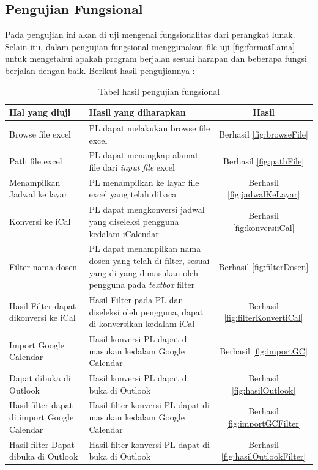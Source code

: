 \subsection{Pengujian Fungsional}
Pada pengujian ini akan di uji mengenai fungsionalitas dari perangkat lunak. Selain itu, dalam pengujian fungsional menggunakan file uji \ref{fig:formatLama} untuk mengetahui apakah program berjalan sesuai harapan dan beberapa fungsi berjalan dengan baik. Berikut hasil pengujiannya : 
\begin{table}[H]
	\centering
		\caption{Tabel hasil pengujian fungsional}
		\label{tab:fungsional}
		\begin{tabular}{ | p{4cm} | p{4cm} | c | }
			\hline
				Hal yang diuji & Hasil yang diharapkan & Hasil \\ \hline
				Browse file excel & PL dapat melakukan browse file excel & Berhasil \ref{fig:browseFile}\\ \hline
				Path file excel & PL dapat menangkap alamat file dari \textit{input file} excel & Berhasil \ref{fig:pathFile} \\ \hline
				Menampilkan Jadwal ke layar & PL menampilkan ke layar file excel yang telah dibaca & Berhasil \ref{fig:jadwalKeLayar} \\ \hline
				Konversi ke iCal & PL dapat mengkonversi jadwal yang diseleksi pengguna kedalam iCalendar & Berhasil \ref{fig:konversiiCal} \\ \hline
				Filter nama dosen & PL dapat menampilkan nama dosen yang telah di filter, sesuai yang di yang dimasukan oleh pengguna pada \textit{textbox} filter & Berhasil \ref{fig:filterDosen} \\ \hline
				Hasil Filter dapat dikonversi ke iCal & Hasil Filter pada PL dan diseleksi oleh pengguna, dapat di konversikan kedalam iCal & Berhasil \ref{fig:filterKonvertiCal} \\ \hline
				Import Google Calendar & Hasil konversi PL dapat di masukan kedalam Google Calendar & Berhasil \ref{fig:importGC} \\ \hline
				Dapat dibuka di Outlook & Hasil konversi PL dapat di buka di Outlook & Berhasil  \ref{fig:hasilOutlook}\\ \hline
				Hasil filter dapat di import Google Calendar & Hasil filter konversi PL dapat di masukan kedalam Google Calendar & Berhasil \ref{fig:importGCFilter} \\ \hline
				Hasil filter Dapat dibuka di Outlook & Hasil filter konversi PL dapat di buka di Outlook & Berhasil \ref{fig:hasilOutlookFilter} \\ \hline
		\end{tabular}
\end{table}

